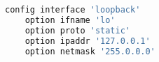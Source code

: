 \begin{lstlisting}[language=bash,caption={Loopback network interface's configuration using UCI.}]
config interface 'loopback'
	option ifname 'lo'
	option proto 'static'
	option ipaddr '127.0.0.1'
	option netmask '255.0.0.0'
\end{lstlisting}